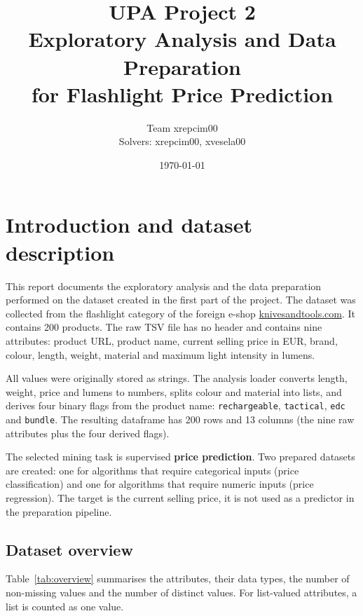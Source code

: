 \documentclass[11pt,a4paper]{article}
\title{UPA Project 2\\Exploratory Analysis and Data Preparation\\for Flashlight Price Prediction}
\author{Team xrepcim00\\Solvers: xrepcim00, xvesela00}
\date{\today}
\begin{document}
\maketitle
\tableofcontents
\clearpage

\section{Introduction and dataset description}

This report documents the exploratory analysis and the data preparation performed
on the dataset created in the first part of the project. The dataset was collected
from the flashlight category of the foreign e-shop
\href{https://www.knivesandtools.com/en/ct/flashlights.htm}{knivesandtools.com}.
It contains 200 products. The raw TSV file has no header and contains nine
attributes: product URL, product name, current selling price in EUR, brand,
colour, length, weight, material and maximum light intensity in lumens.

All values were originally stored as strings. The analysis loader converts
length, weight, price and lumens to numbers, splits colour and material into
lists, and derives four binary flags from the product name:
\texttt{rechargeable}, \texttt{tactical}, \texttt{edc} and \texttt{bundle}.
The resulting dataframe has 200 rows and 13 columns (the nine raw attributes
plus the four derived flags).

The selected mining task is supervised \textbf{price prediction}. Two prepared
datasets are created: one for algorithms that require categorical inputs
(price classification) and one for algorithms that require numeric inputs
(price regression). The target is the current selling price, it is not used as
a predictor in the preparation pipeline.

\subsection{Dataset overview}

Table~\ref{tab:overview} summarises the attributes, their data types, the number
of non-missing values and the number of distinct values. For list-valued
attributes, a list is counted as one value.
\end{document}
